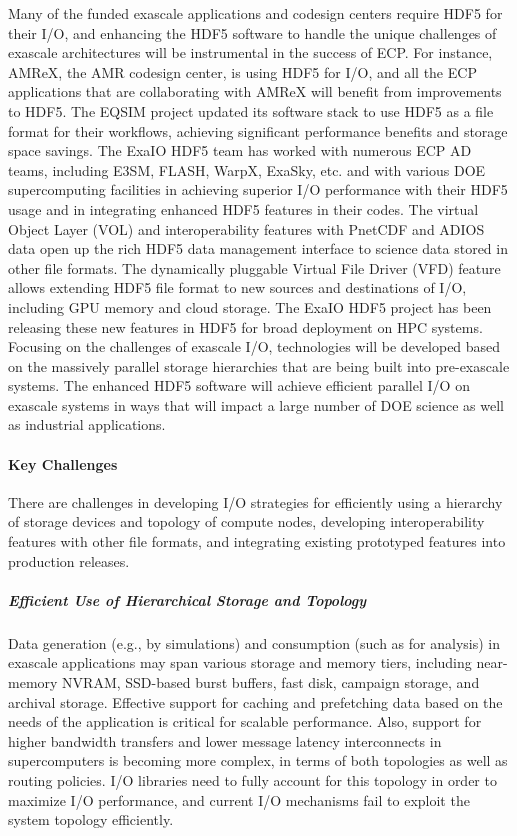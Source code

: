 Many of the funded exascale applications and codesign centers require HDF5 for their I/O, and enhancing the HDF5 software to handle the unique challenges of exascale architectures will be instrumental in the success of ECP. For instance, AMReX, the AMR codesign center, is using HDF5 for I/O, and all the ECP applications that are collaborating with AMReX will benefit from improvements to HDF5. The EQSIM project updated its software stack to use HDF5 as a file format for their workflows, achieving significant performance benefits and storage space savings. The ExaIO HDF5 team has worked with numerous ECP AD teams, including E3SM, FLASH, WarpX, ExaSky, etc. and with various DOE supercomputing facilities in achieving superior I/O performance with their HDF5 usage and in integrating enhanced HDF5 features in their codes.
The virtual Object Layer (VOL) and interoperability features with PnetCDF and ADIOS data open up the rich HDF5 data management interface to science data stored in other file formats. The dynamically pluggable Virtual File Driver (VFD) feature allows extending HDF5 file format to new sources and destinations of I/O, including GPU memory and cloud storage. The ExaIO HDF5 project has been releasing these new features in HDF5 for broad deployment on HPC systems. Focusing on the challenges of exascale I/O, technologies will be developed based on the massively parallel storage hierarchies that are being built into pre-exascale systems. The enhanced HDF5 software will achieve efficient parallel I/O on exascale systems in ways that will impact a large number of DOE science as well as industrial applications.

\paragraph{Key Challenges}
There are challenges in developing I/O strategies for efficiently using a hierarchy of storage devices and topology of compute nodes, developing interoperability features with other file formats, and integrating existing prototyped features into production releases. 

\subparagraph{Efficient Use of Hierarchical Storage and Topology} Data generation (e.g., by simulations) and consumption (such as for analysis) in exascale applications may span various storage and memory tiers, including near-memory NVRAM, SSD-based burst buffers, fast disk, campaign storage, and archival storage. Effective support for caching and prefetching data based on the needs of the application is critical for scalable performance. Also, support for higher bandwidth transfers and lower message latency interconnects in supercomputers is becoming more complex, in terms of both topologies as well as routing policies. I/O libraries need to fully account for this topology in order to maximize I/O performance, and current I/O mechanisms fail to exploit the system topology efficiently.

